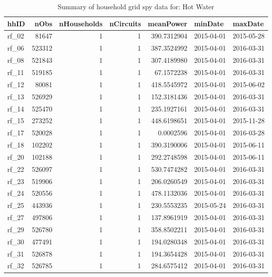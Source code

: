 \documentclass[]{article}
\begin{document}
\begin{table}

\caption{\label{tab:sumamrise loaded data}Summary of household grid spy data for: Hot Water}
\centering
\begin{tabular}[t]{l|r|r|r|r|l|l}
\hline
hhID & nObs & nHouseholds & nCircuits & meanPower & minDate & maxDate\\
\hline
rf\_02 & 81647 & 1 & 1 & 390.7312904 & 2015-04-01 & 2015-05-28\\
\hline
rf\_06 & 523312 & 1 & 1 & 387.3524992 & 2015-04-01 & 2016-03-31\\
\hline
rf\_08 & 521843 & 1 & 1 & 307.4189980 & 2015-04-01 & 2016-03-31\\
\hline
rf\_11 & 519185 & 1 & 1 & 67.1572238 & 2015-04-01 & 2016-03-31\\
\hline
rf\_12 & 80081 & 1 & 1 & 418.5545972 & 2015-04-01 & 2015-06-02\\
\hline
rf\_13 & 526929 & 1 & 1 & 152.3181436 & 2015-04-01 & 2016-03-31\\
\hline
rf\_14 & 525470 & 1 & 1 & 235.1927161 & 2015-04-01 & 2016-03-31\\
\hline
rf\_15 & 273252 & 1 & 1 & 448.6198651 & 2015-04-01 & 2015-11-28\\
\hline
rf\_17 & 520028 & 1 & 1 & 0.0002596 & 2015-04-01 & 2016-03-28\\
\hline
rf\_18 & 102202 & 1 & 1 & 390.3190006 & 2015-04-01 & 2015-06-11\\
\hline
rf\_20 & 102188 & 1 & 1 & 292.2748598 & 2015-04-01 & 2015-06-11\\
\hline
rf\_22 & 526097 & 1 & 1 & 530.7474282 & 2015-04-01 & 2016-03-31\\
\hline
rf\_23 & 519906 & 1 & 1 & 206.0260549 & 2015-04-01 & 2016-03-31\\
\hline
rf\_24 & 520556 & 1 & 1 & 478.1132036 & 2015-04-01 & 2016-03-31\\
\hline
rf\_25 & 443936 & 1 & 1 & 230.5553235 & 2015-05-24 & 2016-03-31\\
\hline
rf\_27 & 497806 & 1 & 1 & 137.8961919 & 2015-04-01 & 2016-03-31\\
\hline
rf\_29 & 526780 & 1 & 1 & 358.8502211 & 2015-04-01 & 2016-03-31\\
\hline
rf\_30 & 477491 & 1 & 1 & 194.0280348 & 2015-04-01 & 2016-03-31\\
\hline
rf\_31 & 526878 & 1 & 1 & 194.3654428 & 2015-04-01 & 2016-03-31\\
\hline
rf\_32 & 526785 & 1 & 1 & 284.6575412 & 2015-04-01 & 2016-03-31\\

\end{tabular}
\end{table}
\end{document}
